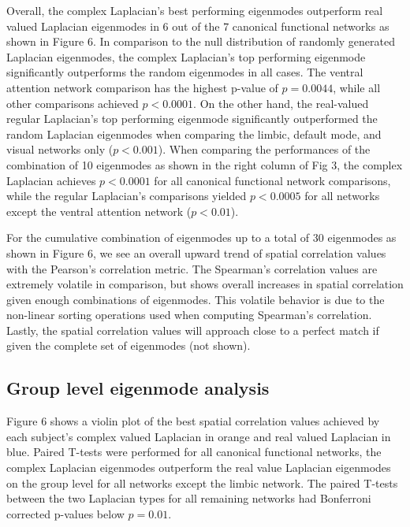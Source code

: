 \documentclass{article}
\begin{document}
Overall, the complex Laplacian's best performing eigenmodes outperform real valued Laplacian eigenmodes in 6 out of the 7 canonical functional networks as shown in Figure 6. In comparison to the null distribution of randomly generated Laplacian eigenmodes, the complex Laplacian's top performing eigenmode significantly outperforms the random eigenmodes in all cases. The ventral attention network comparison has the highest p-value of $p=0.0044$, while all other comparisons achieved $p< 0.0001$. On the other hand, the real-valued regular Laplacian's top performing eigenmode significantly outperformed the random Laplacian eigenmodes when comparing the limbic, default mode, and visual networks only ($p<0.001$). When comparing the performances of the combination of 10 eigenmodes as shown in the right column of Fig 3, the complex Laplacian achieves $p<0.0001$ for all canonical functional network comparisons, while the regular Laplacian's comparisons yielded $p<0.0005$ for all networks except the ventral attention network ($p<0.01$).

For the cumulative combination of eigenmodes up to a total of 30 eigenmodes as shown in Figure 6, we see an overall upward trend of spatial correlation values with the Pearson's correlation metric. The Spearman's correlation values are extremely volatile in comparison, but shows overall increases in spatial correlation given enough combinations of eigenmodes. This volatile behavior is due to the non-linear sorting operations used when computing Spearman's correlation. Lastly, the spatial correlation values will approach close to a perfect match if given the complete set of eigenmodes (not shown).

\subsection{Group level eigenmode analysis}
Figure 6 shows a violin plot of the best spatial correlation values achieved by each subject's complex valued Laplacian in orange and real valued Laplacian in blue. Paired T-tests were performed for all canonical functional networks, the complex Laplacian eigenmodes outperform the real value Laplacian eigenmodes on the group level for all networks except the limbic network. The paired T-tests between the two Laplacian types for all remaining networks had Bonferroni corrected p-values below $p = 0.01$. 
\end{document}
